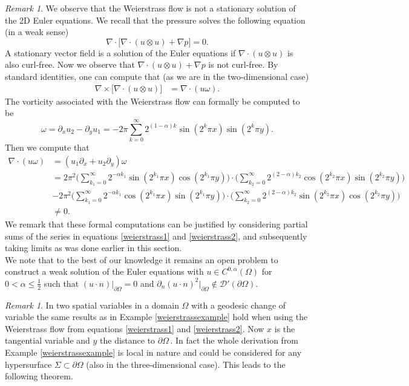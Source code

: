 \documentclass[12pt,a4paper]{article}
\theoremstyle{definition}
\theoremstyle{remark}
\newtheorem{remark}[theorem]{Remark}
\numberwithin{equation}{section}
\def \del {\partial}
\begin{document}
\begin{remark}
We observe that the Weierstrass flow is not a stationary solution of the 2D Euler equations. We recall that the pressure solves the following equation (in a weak sense)
\begin{equation*}
\nabla \cdot \big[ \nabla \cdot (u \otimes u) + \nabla p \big] = 0.
\end{equation*}
A stationary vector field is a solution of the Euler equations if $\nabla \cdot (u \otimes u)$ is also curl-free. Now we observe that $\nabla \cdot (u \otimes u) + \nabla p$ is not curl-free. By standard identities, one can compute that (as we are in the two-dimensional case)
\begin{align*}
\nabla \times \big[ \nabla \cdot (u \otimes u)  \big] &= \nabla \cdot (u \omega).
\end{align*}
The vorticity associated with the Weierstrass flow can formally be computed to be
\begin{equation}
\omega = \partial_x u_2 - \partial_y u_1 = - 2 \pi \sum_{k=0}^\infty 2^{(1-\alpha)k} \sin (2^k \pi x) \sin (2^k \pi y).
\end{equation}
Then we compute that
\begin{align*}
\nabla \cdot (u \omega) &= (u_1 \partial_x + u_2 \partial_y) \omega \\
&= 2 \pi^2 \bigg( \sum_{k_1=0}^\infty 2^{-\alpha k_1} \sin (2^{k_1} \pi x) \cos (2^{k_1} \pi y) \bigg) \cdot \bigg( \sum_{k_2=0}^\infty 2^{(2-\alpha)k_2} \cos (2^{k_2} \pi x) \sin (2^{k_2} \pi y) \bigg) \\
&-2 \pi^2 \bigg( \sum_{k_1=0}^\infty 2^{-\alpha k_1} \cos (2^{k_1} \pi x) \sin (2^{k_1} \pi y) \bigg) \cdot \bigg( \sum_{k_2=0}^\infty 2^{(2-\alpha)k_2} \sin (2^{k_2} \pi x) \cos (2^{k_2} \pi y) \bigg) \\
&\neq 0.
\end{align*}
We remark that these formal computations can be justified by considering partial sums of the series in equations \eqref{weierstrass1} and \eqref{weierstrass2}, and subsequently taking limits as was done earlier in this section. \\
We note that to the best of our knowledge it remains an open problem to construct a weak solution of the Euler equations with $u \in C^{0,\alpha} (\Omega)$ for $0 < \alpha \leq \frac{1}{2}$ such that $(u \cdot n) \lvert_{\partial \Omega} = 0$ and $\partial_n (u \cdot n)^2 \lvert_{\partial \Omega} \notin \mathcal{D}' (\partial \Omega)$.
\end{remark}
\begin{remark}
In two spatial variables in a domain $\Omega$ with a geodesic change of variable the same results as in Example \ref{weierstrassexample}  hold when using the Weierstrass flow from equations \eqref{weierstrass1} and \eqref{weierstrass2}. Now $x$ is the tangential variable and $y$ the distance to $\del\Omega\,.$ In fact the whole derivation from Example \ref{weierstrassexample} is local in nature and could be considered for any hypersurface $\Sigma \subset \del \Omega$ (also in the three-dimensional case). This leads to the following theorem.
\end{remark} 
\end{document}
